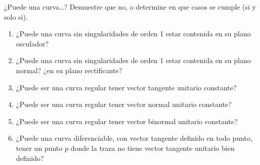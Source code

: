 \documentclass{homework}
\begin{document}
\begin{prob}
    ¿Puede una curva\dots? Demuestre que no, o determine en que casos se cumple (si y solo si).
    \begin{enumerate}
        \item ¿Puede una curva sin singularidades de orden 1 estar contenida en su plano osculador?
        \item ¿Puede una curva sin singularidades de orden 1 estar contenida en su plano normal? ¿en su plano rectificante?
        \item ¿Puede ser una curva regular tener vector tangente unitario constante?
        \item ¿Puede ser una curva regular tener vector normal unitario constante?
        \item ¿Puede ser una curva regular tener vector binormal unitario constante?
        \item ¿Puede una curva diferenciable, con vector tangente definido en todo punto, tener un punto \(p\) donde la traza no tiene vector tangente unitario bien definido?
    \end{enumerate}
\end{prob}
\end{document}
